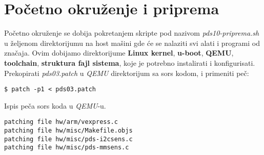 \documentclass{article}
\begin{document}
\section{Početno okruženje i priprema}








Početno okruženje se dobija pokretanjem skripte pod nazivom \textit{pds10-priprema.sh} u željenom direktorijumu na host mašini gde će se nalaziti svi alati i programi od značaja. Ovim dobijamo direktorijume \textbf{Linux kernel}, \textbf{u-boot}, \textbf{QEMU}, \textbf{toolchain}, \textbf{struktura fajl sistema}, koje je potrebno instalirati i konfigurisati. \\

Prekopirati \textit{pds03.patch} u \textit{QEMU} direktorijum sa sors kodom, i primeniti peč:

\begin{commandline}
  \begin{verbatim}
$ patch -p1 < pds03.patch
  \end{verbatim}
\end{commandline}

Ispis peča sors koda u \textit{QEMU}-u. \\

\begin{commandline}
  \begin{verbatim}
patching file hw/arm/vexpress.c
patching file hw/misc/Makefile.objs
patching file hw/misc/pds-i2csens.c
patching file hw/misc/pds-mmsens.c
  \end{verbatim}
\end{commandline}
\end{document}
